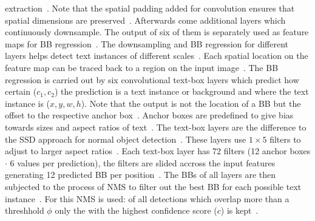 extraction~\citep{liao_textboxes_2017,simonyan_very_2015}.
Note that the spatial padding added for convolution ensures that spatial dimensions are
preserved~\citep{simonyan_very_2015}.
Afterwards come additional layers which continuously downsample.
The output of six of them is separately used as feature maps for \ac{BB}
regression~\citep{liao_textboxes_2017}.
The downsampling and \ac{BB} regression for different layers helps detect text instances of different
scales~\citep{liu_ssd_2016}.
Each spatial location on the feature map can be traced back to a region on the input
image~\citep{long_scene_2021}.
The \ac{BB} regression is carried out by six convolutional text-box layers which predict how
certain ($c_1,c_2$) the prediction is a text instance or background and where the text instance
is ($x,y,w,h$).
Note that the output is not the location of a \ac{BB} but the offset to the
respective anchor box~\citep{liao_textboxes_2017,long_scene_2021}.
Anchor boxes are predefined to give bias towards sizes and aspect ratios of
text~\citep{liao_textboxes_2017}.
The text-box layers are the difference to the SSD approach for normal object
detection~\citep{liao_textboxes_2017,liu_ssd_2016}.
These layers use $1\times5$ filters to adjust to larger aspect ratios~\citep{liao_textboxes_2017}.
Each text-box layer has 72 filters (12 anchor boxes $\cdot$ 6 values per prediction), the filters
are slided accross the input features generating 12 predicted \ac{BB} per
position~\citep{liao_textboxes_2017}.
The \acp{BB} of all layers are then subjected to the process of \ac{NMS} to filter out the best
\ac{BB} for each possible text instance~\citep{liao_textboxes_2017}.
For this \ac{NMS} is used: of all detections which overlap more than a threshhold $\phi$ only the
with the highest confidence score ($c$) is kept~\citep{hosang_learning_2017}.


